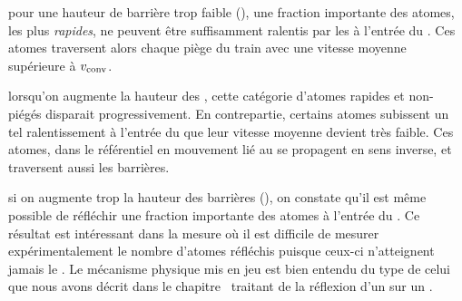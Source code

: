 \begin{ditemize}
	\item pour une hauteur de barrière trop faible (), une fraction importante des atomes, les plus \emph{rapides}, ne peuvent être suffisamment ralentis par les \bapots à l'entrée du \tp. Ces atomes traversent alors chaque piège du train avec une vitesse moyenne supérieure à ${v_{\rm conv}}$.
%
%
	\item lorsqu'on augmente la hauteur des \bapots, cette catégorie d'atomes rapides et non-piégés disparait progressivement. 
	En contrepartie, certains atomes subissent un tel ralentissement à l'entrée du \tp que leur vitesse moyenne devient très faible. Ces atomes, dans le référentiel en mouvement lié au \conv se propagent en sens inverse, et traversent aussi les barrières.
%
	\item si on augmente trop la hauteur des barrières (\eg {}), on constate qu'il est même possible de réfléchir une fraction importante des atomes à l'entrée du \tp. Ce résultat est intéressant dans la mesure où il est difficile de mesurer expérimentalement le nombre d'atomes réfléchis puisque ceux-ci n'atteignent jamais le \lsonde. Le mécanisme physique mis en jeu est bien entendu du type de celui que nous avons décrit dans le chapitre~ traitant de la réflexion d'un \pat sur un \mimamo.
\end{ditemize}

